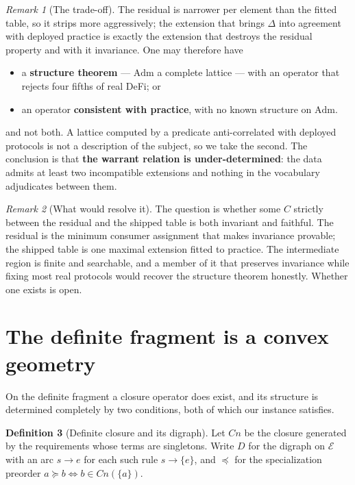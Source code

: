 \documentclass[11pt]{article}
\theoremstyle{definition}
\newtheorem{definition}{Definition}[section]
\theoremstyle{plain}
\theoremstyle{remark}
\newtheorem{remark}[definition]{Remark}
\newcommand{\Adm}{\mathrm{Adm}}
\newcommand{\El}{\mathcal{E}}
\begin{document}
\begin{remark}[The trade-off]
The residual is narrower per element than the fitted table, so it strips more
aggressively; the extension that brings $\Delta$ into agreement with deployed
practice is exactly the extension that destroys the residual property and with it
invariance. One may therefore have
\begin{itemize}
  \item a \textbf{structure theorem} --- $\Adm$ a complete lattice --- with an
    operator that rejects four fifths of real DeFi; or
  \item an operator \textbf{consistent with practice}, with no known structure on
    $\Adm$.
\end{itemize}
and not both. A lattice computed by a predicate anti-correlated with deployed
protocols is not a description of the subject, so we take the second. The
conclusion is that \textbf{the warrant relation is under-determined}: the data
admits at least two incompatible extensions and nothing in the vocabulary
adjudicates between them.
\end{remark}

\begin{remark}[What would resolve it]
The question is whether some $C$ strictly between the residual and the shipped
table is both invariant and faithful. The residual is the minimum consumer
assignment that makes invariance provable; the shipped table is one maximal
extension fitted to practice. The intermediate region is finite and searchable,
and a member of it that preserves invariance while fixing most real protocols
would recover the structure theorem honestly. Whether one exists is open.
\end{remark}

\section{The definite fragment is a convex geometry}\label{sec:convex}

On the definite fragment a closure operator does exist, and its structure is
determined completely by two conditions, both of which our instance satisfies.

\begin{definition}[Definite closure and its digraph]\label{def:cn}
Let $Cn$ be the closure generated by the requirements whose terms are singletons.
Write $D$ for the digraph on $\El$ with an arc $s \to e$ for each such rule
$s \to \{e\}$, and $\preceq$ for the specialization preorder
$a \succeq b \iff b \in Cn(\{a\})$.
\end{definition}
\end{document}
